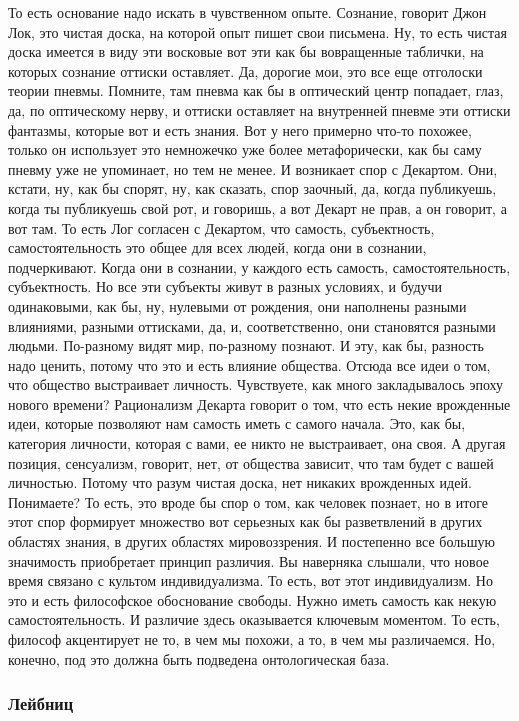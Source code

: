 То есть основание надо искать в чувственном опыте. Сознание,
говорит Джон Лок, это чистая доска, на которой опыт пишет свои письмена. Ну, то
есть чистая доска имеется в виду эти восковые вот эти как бы вовращенные
таблички, на которых сознание оттиски оставляет. Да, дорогие мои, это все еще
отголоски теории пневмы. Помните, там пневма как бы в оптический центр попадает,
глаз, да, по оптическому нерву, и оттиски оставляет на внутренней пневме эти
оттиски фантазмы, которые вот и есть знания. Вот у него примерно что-то похожее,
только он использует это немножечко уже более метафорически, как бы саму пневму
уже не упоминает, но тем не менее. И возникает спор с Декартом. Они, кстати, ну,
как бы спорят, ну, как сказать, спор заочный, да, когда публикуешь, когда ты
публикуешь свой рот, и говоришь, а вот Декарт не прав, а он говорит, а вот там.
То есть Лог согласен с Декартом, что самость, субъектность, самостоятельность
это общее для всех людей, когда они в сознании, подчеркивают. Когда они в
сознании, у каждого есть самость, самостоятельность, субъектность. Но все эти
субъекты живут в разных условиях, и будучи одинаковыми, как бы, ну, нулевыми от
рождения, они наполнены разными влияниями, разными оттисками, да, и,
соответственно, они становятся разными людьми. По-разному видят мир, по-разному
познают. И эту, как бы, разность надо ценить, потому что это и есть влияние
общества. Отсюда все идеи о том, что общество выстраивает личность. Чувствуете,
как много закладывалось эпоху нового времени? Рационализм Декарта говорит о том,
что есть некие врожденные идеи, которые позволяют нам самость иметь с самого
начала. Это, как бы, категория личности, которая с вами, ее никто не
выстраивает, она своя. А другая позиция, сенсуализм, говорит, нет, от общества
зависит, что там будет с вашей личностью. Потому что разум чистая доска, нет
никаких врожденных идей. Понимаете? То есть, это вроде бы спор о том, как
человек познает, но в итоге этот спор формирует множество вот серьезных как бы
разветвлений в других областях знания, в других областях мировоззрения. И
постепенно все большую значимость приобретает принцип различия. Вы наверняка
слышали, что новое время связано с культом индивидуализма. То есть, вот этот
индивидуализм. Но это и есть философское обоснование свободы. Нужно иметь
самость как некую самостоятельность. И различие здесь оказывается ключевым
моментом. То есть, философ акцентирует не то, в чем мы похожи, а то, в чем мы
различаемся. Но, конечно, под это должна быть подведена онтологическая база. 

\subsubsection{Лейбниц}

